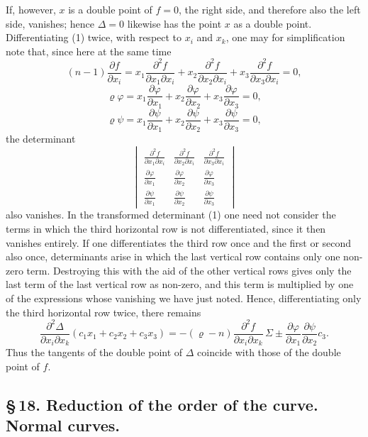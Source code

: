 \documentclass[10pt]{article}
\begin{document}
If, however, \(x\) is a double point of \(f=0\), the right side, and therefore also the left side, vanishes; hence \(\Delta=0\) likewise has the point \(x\) as a double point. Differentiating (1) twice, with respect to \(x_i\) and \(x_k\), one may for simplification note that, since here at the same time
\[
(n-1)\frac{\partial f}{\partial x_i}
=x_1\frac{\partial^2 f}{\partial x_1\partial x_i}
+x_2\frac{\partial^2 f}{\partial x_2\partial x_i}
+x_3\frac{\partial^2 f}{\partial x_3\partial x_i}=0,
\]
\[
\varrho\varphi
=x_1\frac{\partial\varphi}{\partial x_1}
+x_2\frac{\partial\varphi}{\partial x_2}
+x_3\frac{\partial\varphi}{\partial x_3}=0,
\]
\[
\varrho\psi
=x_1\frac{\partial\psi}{\partial x_1}
+x_2\frac{\partial\psi}{\partial x_2}
+x_3\frac{\partial\psi}{\partial x_3}=0,
\]
the determinant
\[
\begin{vmatrix}
\frac{\partial^2 f}{\partial x_1\partial x_i}&
\frac{\partial^2 f}{\partial x_2\partial x_i}&
\frac{\partial^2 f}{\partial x_3\partial x_i}\\
\frac{\partial\varphi}{\partial x_1}&
\frac{\partial\varphi}{\partial x_2}&
\frac{\partial\varphi}{\partial x_3}\\
\frac{\partial\psi}{\partial x_1}&
\frac{\partial\psi}{\partial x_2}&
\frac{\partial\psi}{\partial x_3}
\end{vmatrix}
\]
also vanishes. In the transformed determinant (1) one need not consider the terms in which the third horizontal row is not differentiated, since it then vanishes entirely. If one differentiates the third row once and the first or second also once, determinants arise in which the last vertical row contains only one non-zero term. Destroying this with the aid of the other vertical rows gives only the last term of the last vertical row as non-zero, and this term is multiplied by one of the expressions whose vanishing we have just noted. Hence, differentiating only the third horizontal row twice, there remains
\[
\frac{\partial^2\Delta}{\partial x_i\partial x_k}
(c_1x_1+c_2x_2+c_3x_3)
=-(\varrho-n)\frac{\partial^2f}{\partial x_i\partial x_k}
\,\Sigma\pm
\frac{\partial\varphi}{\partial x_1}
\frac{\partial\psi}{\partial x_2}c_3.
\]
Thus the tangents of the double point of \(\Delta\) coincide with those of the double point of \(f\).

\subsection*{\S\,18. Reduction of the order of the curve. Normal curves.}
\end{document}
